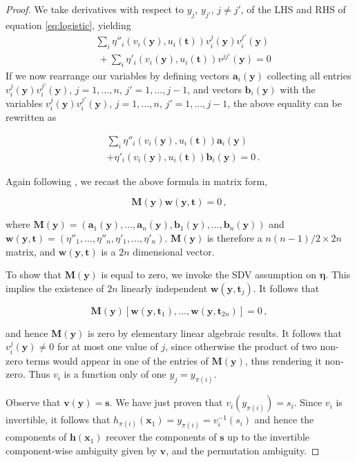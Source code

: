 \begin{proof}
We take derivatives with respect to $y_j$, $y_{j'}$, $j \neq j'$,  of the LHS and RHS of equation \ref{eq:logistic}, yielding
\begin{align*}
&\sum_{i} \eta''_{i}(v_{i}(\bm{y}),u_{i}(\bm{t}))v^j_i(\bm{y})v^{j'}_i(\bm{y}) \\
&\ + \sum_{i}\eta'_{i}(v_{i}(\bm{y}), u_{i}(\bm{t}))v^{jj'}(\bm{y})=0
\end{align*}
If we now rearrange our variables by defining vectors $\bm{a}_i(\bm{y})$ collecting all entries $v_i^j(\bm{y})v_i^{j'}(\bm{y})$, $j=1, \ldots, n$, $j'=1, \ldots, j-1$, and vectors $\bm{b}_i(\bm{y})$ with the variables $v_i^j(\bm{y})v_i^{j'}(\bm{y})$, $j=1, \ldots, n$, $j'=1, \ldots, j-1$, the above equality can be rewritten as

\begin{align*}
&\sum_{i} \eta''_{i}(v_{i}(\bm{y}),u_{i}(\bm{t}))\bm{a}_i(\bm{y}) \\
&+ \eta'_{i}(v_{i}(\bm{y}), u_{i}(\bm{t}))\bm{b}_i(\bm{y})=0\,.
\end{align*}

Again following \cite{hyvarinen19a}, we recast the above formula in matrix form,

\begin{equation}
\label{eq:matrixmult}
\bm{M}(\bm{y})\bm{w}(\bm{y}, \bm{t})=0\,,
\end{equation}

where $\bm{M}(\bm{y}) = (\bm{a}_1(\bm{y}), \ldots,  \bm{a}_n(\bm{y}), \bm{b}_1(\bm{y}), \ldots, \bm{b}_n(\bm{y})) $ and $\bm{w}(\bm{y}, \bm{t}) = (\eta''_{1}, \ldots, \eta''_{n}, \eta'_{1}, \ldots,\eta'_{n})$. $\bm{M}(\bm{y})$ is therefore a $n(n-1)/2 \times 2n$ matrix, and $\bm{w}(\bm{y}, \bm{t})$ is a $2n$ dimensional vector.

To show that $\bm{M}(\bm{y})$ is equal to zero, we invoke the SDV assumption on $\bm{\eta}$.
This implies the existence of $2n$ linearly independent $\bm{w}(\bm{y}, \bm{t}_j)$.
It follows that

\[
\bm{M}(\bm{y})[\bm{w}(\bm{y}, \bm{t}_1), \ldots, \bm{w}(\bm{y}, \bm{t}_{2n})]=0\,,
\]

and hence $\bm{M}(\bm{y})$ is zero by elementary linear algebraic results.
It follows that $v_i^j(\bm{y})\not=0$ for at most one value of $j$, since otherwise the product of two non-zero terms would appear in one of the entries of $\bm{M}(\bm{y})$, thus rendering it non-zero.
Thus $v_i$ is a function only of one $y_j = y_{\pi(i)}$.

Observe that $\bm{v}(\bm{y}) = \bm{s}$.
We have just proven that $v_i(y_{\pi(i)}) = s_i$.
Since $v_i$ is invertible, it follows that $h_{\pi(i)}(\bm{x}_{1}) = y_{\pi(i)} = v_i^{-1}(s_i)$ and hence the components of $\bm{h}(\bm{x}_{1})$ recover the components of $\bm{s}$ up to the invertible component-wise ambiguity given by $\bm{v}$, and the permutation ambiguity.


\end{proof}
